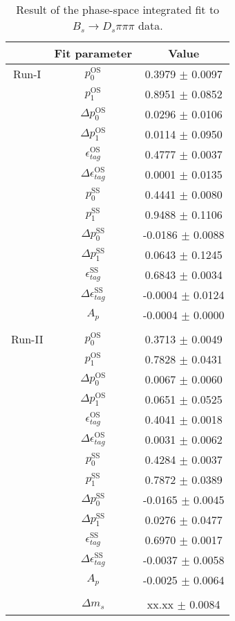 \begin{table}[h]
\centering
\caption{Result of the phase-space integrated fit to $B_s \to D_s \pi \pi \pi$ data.}
\begin{tabular}{c c c}
\hline
\hline
& Fit parameter & Value \\
\hline
Run-I & $p_{0}^{\text{OS}}$ & 0.3979 $\pm$ 0.0097\\
&$p_{1}^{\text{OS}}$  & 0.8951 $\pm$ 0.0852\\
&$\Delta p_{0}^{\text{OS}}$  & 0.0296 $\pm$ 0.0106\\
&$\Delta p_{1}^{\text{OS}}$  & 0.0114 $\pm$ 0.0950\\
&$\epsilon_{tag}^{\text{OS}}$  & 0.4777 $\pm$ 0.0037\\
&$\Delta\epsilon_{tag}^{\text{OS}}$  & 0.0001 $\pm$ 0.0135\\
& $p_{0}^{\text{SS}}$ & 0.4441 $\pm$ 0.0080\\
&$p_{1}^{\text{SS}}$  & 0.9488 $\pm$ 0.1106\\
&$\Delta p_{0}^{\text{SS}}$  & -0.0186 $\pm$ 0.0088\\
&$\Delta p_{1}^{\text{SS}}$  & 0.0643 $\pm$ 0.1245\\
&$\epsilon_{tag}^{\text{SS}}$  & 0.6843 $\pm$ 0.0034\\
&$\Delta\epsilon_{tag}^{\text{SS}}$  & -0.0004 $\pm$ 0.0124\\
&$A_{p}$ & -0.0004 $\pm$ 0.0000\\
\\
Run-II & $p_{0}^{\text{OS}}$  & 0.3713 $\pm$ 0.0049\\
&$p_{1}^{\text{OS}}$  & 0.7828 $\pm$ 0.0431\\
&$\Delta p_{0}^{\text{OS}}$  & 0.0067 $\pm$ 0.0060\\
&$\Delta p_{1}^{\text{OS}}$  & 0.0651 $\pm$ 0.0525\\
&$\epsilon_{tag}^{\text{OS}}$  & 0.4041 $\pm$ 0.0018\\
&$\Delta\epsilon_{tag}^{\text{OS}}$  & 0.0031 $\pm$ 0.0062\\
& $p_{0}^{\text{SS}}$  & 0.4284 $\pm$ 0.0037\\
&$p_{1}^{\text{SS}}$  & 0.7872 $\pm$ 0.0389\\
&$\Delta p_{0}^{\text{SS}}$  & -0.0165 $\pm$ 0.0045\\
&$\Delta p_{1}^{\text{SS}}$  & 0.0276 $\pm$ 0.0477\\
&$\epsilon_{tag}^{\text{SS}}$  & 0.6970 $\pm$ 0.0017\\
&$\Delta\epsilon_{tag}^{\text{SS}}$  & -0.0037 $\pm$ 0.0058\\
&$A_{p}$ & -0.0025 $\pm$ 0.0064\\
\\
&$\Delta m_{s}$ &  xx.xx  $\pm$ 0.0084\\
\hline
\hline
\end{tabular}
\label{table:timeFit_norm}
\end{table}
